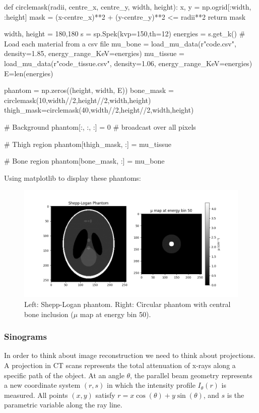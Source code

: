 \documentclass{article}
\begin{document}
\begin{python}
def circlemask(radii, centre_x, centre_y, width, height):
    x, y = np.ogrid[:width, :height]
    mask = (x-centre_x)**2 + (y-centre_y)**2 <= radii**2
    return mask
   
width, height = 180,180
s = sp.Spek(kvp=150,th=12)
energies = s.get_k()
# Load each material from a csv file
mu_bone = load_mu_data(r"code\bone.csv", density=1.85, energy_range_KeV=energies)
mu_tissue = load_mu_data(r"code\soft_tissue.csv", density=1.06, energy_range_KeV=energies)
E=len(energies)

phantom = np.zeros((height, width, E))
bone_mask = circlemask(10,width//2,height//2,width,height)
thigh_mask=circlemask(40,width//2,height//2,width,height)

# Background
phantom[:, :, :] = 0  # broadcast over all pixels

# Thigh region
phantom[thigh_mask, :] = mu_tissue

# Bone region
phantom[bone_mask, :] = mu_bone
\end{python}

Using matplotlib to display these phantoms:

\begin{figure}[H]
	\includegraphics[width=\linewidth]{simplephantom.png}
	\caption{Left: Shepp-Logan phantom. Right: Circular phantom with central bone inclusion ($\mu$ map at energy bin 50).}
	\label{fig:phantoms}
\end{figure}

\subsubsection{Sinograms}
In order to think about image reconstruction we need to think about projections. A projection in CT scans represents the total attenuation of x-rays along a specific path of the object. At an angle $\theta$, the parallel beam geometry represents a new coordinate system $(r, s)$ in which the intensity profile $I_\theta (r)$ is measured. 
All points $(x,y)$ satisfy $r = x \cos(\theta) + y \sin(\theta)$, and $s$ is the parametric variable along the ray line.
\end{document}
